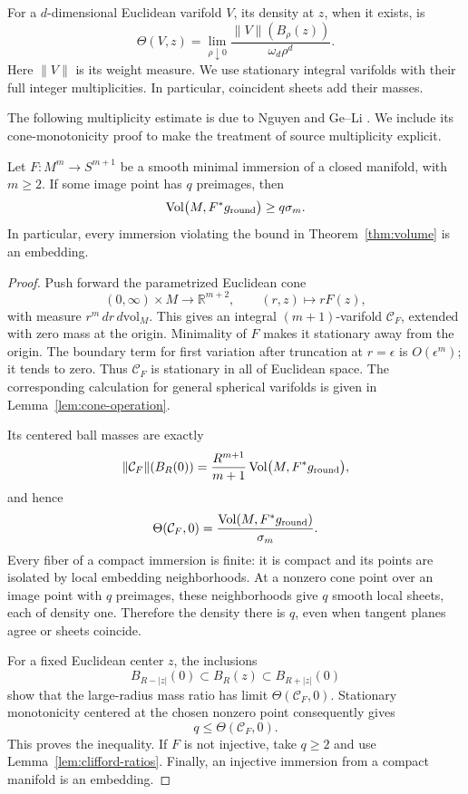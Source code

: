 For a \(d\)-dimensional Euclidean varifold \(V\), its density at \(z\),
when it exists, is
\[
\Theta(V,z)=\lim_{\rho\downarrow0}
\frac{\|V\|(B_\rho(z))}{\omega_d\rho^d}.
\]
Here \(\|V\|\) is its weight measure. We use stationary integral
varifolds with their full integer multiplicities. In particular,
coincident sheets add their masses.

The following multiplicity estimate is due to Nguyen
\cite[Corollary~4.8]{Nguyen2023} and Ge--Li
\cite[Theorem~1.2]{GeLi2022}. We include its cone-monotonicity proof to
make the treatment of source multiplicity explicit.

\begin{proposition}\label{prop:immersion-reduction}
Let \(F:M^m\to S^{m+1}\) be a smooth minimal immersion of a closed
manifold, with \(m\ge2\). If some image point has \(q\) preimages, then
\[
\operatorname{Vol}\bigl(M,F^*g_{\mathrm{round}}\bigr)\ge q\sigma_m.
\]
In particular, every immersion violating the bound in
Theorem~\ref{thm:volume} is an embedding.
\end{proposition}

\begin{proof}
Push forward the parametrized Euclidean cone
\[
(0,\infty)\times M\longrightarrow\mathbb R^{m+2},
\qquad (r,z)\longmapsto rF(z),
\]
with measure \(r^m\,dr\,d\mathrm{vol}_M\). This gives an integral
\((m+1)\)-varifold \(\mathcal C_F\), extended with zero mass at the
origin. Minimality of \(F\) makes it stationary away from the origin.
The boundary term for first variation after truncation at \(r=\epsilon\)
is \(O(\epsilon^m)\); it tends to zero. Thus \(\mathcal C_F\) is
stationary in all of Euclidean space. The corresponding calculation
for general spherical varifolds is given in Lemma~\ref{lem:cone-operation}.

Its centered ball masses are exactly
\[
\|\mathcal C_F\|(B_R(0))
=\frac{R^{m+1}}{m+1}
\operatorname{Vol}\bigl(M,F^*g_{\mathrm{round}}\bigr),
\]
and hence
\[
\Theta(\mathcal C_F,0)
=\frac{\operatorname{Vol}(M,F^*g_{\mathrm{round}})}{\sigma_m}.
\]
Every fiber of a compact immersion is finite: it is compact and its
points are isolated by local embedding neighborhoods. At a nonzero
cone point over an image point with \(q\) preimages, these neighborhoods
give \(q\) smooth local sheets, each of density one. Therefore the density
there is \(q\), even when tangent planes agree or sheets coincide.

For a fixed Euclidean center \(z\), the inclusions
\[
B_{R-|z|}(0)\subset B_R(z)\subset B_{R+|z|}(0)
\]
show that the large-radius mass ratio has limit
\(\Theta(\mathcal C_F,0)\). Stationary monotonicity centered at the
chosen nonzero point consequently gives
\[
q\le \Theta(\mathcal C_F,0).
\]
This proves the inequality. If \(F\) is not injective, take \(q\ge2\)
and use Lemma~\ref{lem:clifford-ratios}. Finally, an injective immersion
from a compact manifold is an embedding.
\end{proof}


